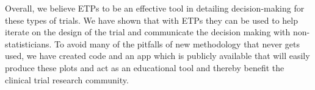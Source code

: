 Overall, we believe ETPs to be an effective tool in detailing decision-making for these types of trials. We have shown that with ETPs they can be used to help iterate on the design of the trial and communicate the decision making with non-statisticians. To avoid many of the pitfalls of new methodology that never gets used, we have created code and an app which is publicly available that will easily produce these plots and act as an educational tool and thereby benefit the clinical trial research community. 